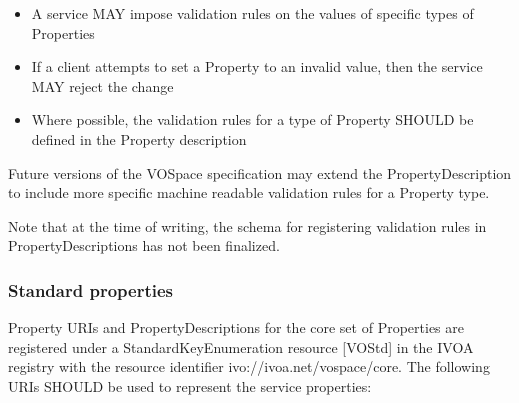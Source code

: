 \documentclass[11pt,a4paper]{ivoa}
\begin{document}
\begin{itemize}
    \item A service MAY impose validation rules on the values of specific types of Properties
    \item If a client attempts to set a Property to an invalid value, then the service MAY reject the change
    \item Where possible, the validation rules for a type of Property SHOULD be defined in the Property description
\end{itemize}

Future versions of the VOSpace specification may extend the PropertyDescription to include more specific machine readable validation rules for a Property type.

Note that at the time of writing, the schema for registering validation rules in PropertyDescriptions has not been finalized.

\subsubsection{Standard properties}
\label{subsubsec:standard properties}
Property URIs and PropertyDescriptions for the core set of Properties are registered under a StandardKeyEnumeration resource [VOStd] in the IVOA registry with the resource identifier ivo://ivoa.net/vospace/core. The following URIs SHOULD be used to represent the service properties:
\end{document}
